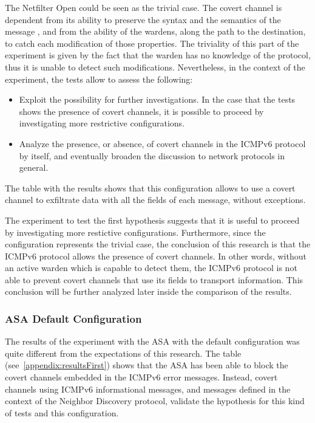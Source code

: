 \documentclass[12pt]{article}
\begin{document}
The Netfilter Open could be seen as the trivial case. The covert channel is dependent from its ability to preserve the syntax and the semantics of the message \cite{lewandowski}, and from the ability of the wardens, along the path to the destination, to catch each modification of those properties. The triviality of this part of the experiment is given by the fact that the warden has no knowledge of the protocol, thus it is unable to detect such modifications. Nevertheless, in the context of the experiment, the tests allow to assess the following:
\vspace{-15pt}
\begin{itemize}[noitemsep,topsep=0pt,partopsep=0pt]
 \item Exploit the possibility for further investigations. In the case that the tests shows the presence of covert channels, it is possible to proceed by investigating more restrictive configurations.
 \item Analyze the presence, or absence, of covert channels in the ICMPv6 protocol by itself, and eventually broaden the discussion to network protocols in general.
\end{itemize}

The table with the results shows that this configuration allows to use a covert channel to exfiltrate data with all the fields of each message, without exceptions.

The experiment to test the first hypothesis suggests that it is useful to proceed by investigating more restictive configurations. Furthermore, since the configuration represents the trivial case, the conclusion of this research is that the ICMPv6 protocol allows the presence of covert channels. In other words, without an active warden which is capable to detect them, the ICMPv6 protocol is not able to prevent covert channels that use its fields to transport information. This conclusion will be further analyzed later inside the comparison of the results.


\subsubsection{ASA Default Configuration}
\label{resultsFirstASADefault}

The results of the experiment with the ASA with the default configuration was quite different from the expectations of this research. The table (see~\ref{appendix:resultsFirst}) shows that the ASA has been able to block the covert channels embedded in the ICMPv6 error messages. Instead, covert channels using ICMPv6 informational messages, and messages defined in the context of the Neighbor Discovery protocol, validate the hypothesis for this kind of tests and this configuration.
\end{document}
